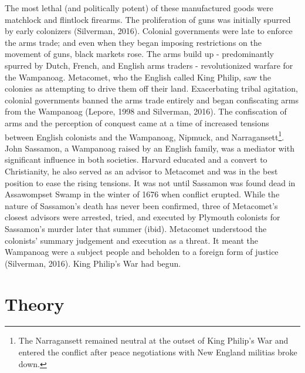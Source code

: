 \documentclass[11pt, oneside]{article}
\begin{document}
The most lethal (and politically potent) of these manufactured goods were matchlock and flintlock firearms. The proliferation of guns was initially spurred by early colonizers (Silverman, 2016). Colonial governments were late to enforce the arms trade; and even when they began imposing restrictions on the movement of guns, black markets rose. The arms build up - predominantly spurred by Dutch, French, and English arms traders - revolutionized warfare for the Wampanoag. Metacomet, who the English called King Philip, saw the colonies as attempting to drive them off their land. Exacerbating tribal agitation, colonial governments banned the arms trade entirely and began confiscating arms from the Wampanoag (Lepore, 1998 and Silverman, 2016). The confiscation of arms and the perception of conquest came at a time of increased tensions between English colonists and the Wampanoag, Nipmuck, and Narragansett\footnote{The Narragansett remained neutral at the outset of King Philip's War and entered the conflict after peace negotiations with New England militias broke down.}. John Sassamon, a Wampanoag raised by an English family, was a mediator with significant influence in both societies. Harvard educated and a convert to Christianity, he also served as an advisor to Metacomet and was in the best position to ease the rising tensions. It was not until Sassamon was found dead in Assawompset Swamp in the winter of 1676 when conflict erupted. While the nature of Sassamon's death has never been confirmed, three of Metacomet's closest advisors were arrested, tried, and executed by Plymouth colonists for Sassamon's murder later that summer (ibid). Metacomet understood the colonists' summary judgement and execution as a threat. It meant the Wampanoag were a subject people and beholden to a foreign form of justice (Silverman, 2016). King Philip's War had begun.

\section{Theory}
\end{document}
